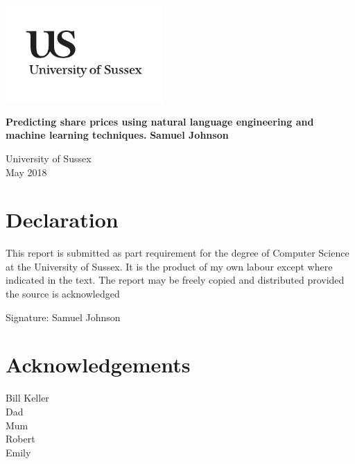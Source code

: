 \documentclass[a4paper,11pt]{report}
\newcommand{\linespacing}{1.5}
\renewcommand{\baselinestretch}{\linespacing}
\begin{document}




\thispagestyle{empty}
\begin{flushright}
\includegraphics[width=6cm]{uslogo}
\end{flushright}
\vskip40mm
\begin{center}
\huge\textbf{Predicting share prices using natural language engineering and machine learning techniques.}
\vskip2mm
\vskip5mm
\Large\textbf{Samuel Johnson}
\normalsize
\end{center}
\vfill
\begin{flushleft}
\large
University of Sussex	\\
May	 2018
\end{flushleft}


\chapter*{Declaration}
This report is submitted as part requirement for the degree of Computer Science at the University of Sussex. It is the product of my own labour except where indicated in the text. The report may be freely copied and distributed provided the source is acknowledged


\vskip5mm
Signature:
\vskip20mm
Samuel Johnson

\chapter*{Acknowledgements}
\renewcommand{\baselinestretch}{\linespacing}
\small\normalsize
Bill Keller\\
Dad\\
Mum\\
Robert\\
Emily\\
\end{document}
